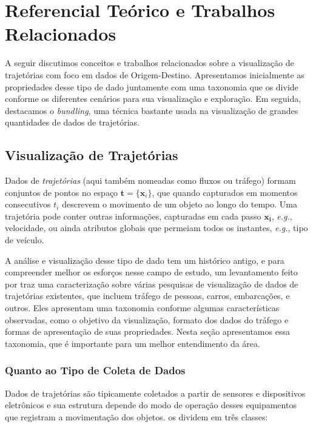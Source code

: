 
\chapter{Referencial Teórico e Trabalhos Relacionados}
\label{cap:referencial-teorico}

  A seguir discutimos conceitos e trabalhos relacionados sobre a visualização de
trajetórias com foco em dados de Origem-Destino. Apresentamos inicialmente as propriedades
desse tipo de dado juntamente com uma taxonomia que os divide conforme os diferentes cenários para
sua visualização e exploração. Em seguida, destacamos o \emph{bundling},
uma técnica bastante usada na visualização de grandes quantidades de dados de trajetórias.

\section{Visualização de Trajetórias}
\label{sec:dados-de-trajetorias}

Dados de \emph{trajetórias} (aqui também nomeadas como fluxos ou tráfego)
formam conjuntos de pontos no espaço $\mathbf{t} = \{\mathbf{x}_i\}$, que quando
capturados em momentos consecutivos $t_i$ descrevem o movimento de um objeto ao
longo do tempo. Uma trajetória pode conter outras informações, capturadas em
cada passo $\mathbf{x_i}$, \emph{e.g.}, velocidade, ou ainda atributos globais
que permeiam todos os instantes, \emph{e.g.}, tipo de veículo.

A análise e visualização desse tipo de dado tem um histórico antigo, e para
compreender melhor os esforços nesse campo de estudo, um levantamento feito por
\citet{Chen2015} traz uma caracterização sobre várias pesquisas de visualização
de dados de trajetórias existentes, que incluem tráfego de pessoas, carros,
embarcações, e outros. Eles apresentam uma taxonomia conforme algumas
características observadas, como o objetivo da visualização, formato dos dados
do tráfego e formas de apresentação de suas propriedades. Nesta seção
apresentamos essa taxonomia, que é importante para um melhor entendimento da
área.

\subsection{Quanto ao Tipo de Coleta de Dados}

Dados de trajetórias são tipicamente coletados a partir de sensores e
dispositivos eletrônicos e sua estrutura depende do modo de operação desses
equipamentos que registram a movimentação dos objetos. \citet{Chen2015} os dividem em três classes:

